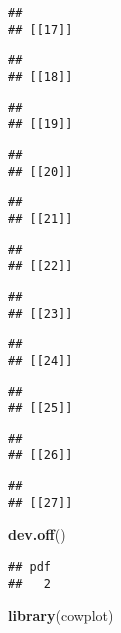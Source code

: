 \documentclass[]{article}
\newenvironment{Shaded}{\begin{snugshade}}{\end{snugshade}}
\newcommand{\KeywordTok}[1]{\textcolor[rgb]{0.13,0.29,0.53}{\textbf{#1}}}
\newcommand{\NormalTok}[1]{#1}
\begin{document}
\begin{verbatim}
## 
## [[17]]
\end{verbatim}

\begin{verbatim}
## 
## [[18]]
\end{verbatim}

\begin{verbatim}
## 
## [[19]]
\end{verbatim}

\begin{verbatim}
## 
## [[20]]
\end{verbatim}

\begin{verbatim}
## 
## [[21]]
\end{verbatim}

\begin{verbatim}
## 
## [[22]]
\end{verbatim}

\begin{verbatim}
## 
## [[23]]
\end{verbatim}

\begin{verbatim}
## 
## [[24]]
\end{verbatim}

\begin{verbatim}
## 
## [[25]]
\end{verbatim}

\begin{verbatim}
## 
## [[26]]
\end{verbatim}

\begin{verbatim}
## 
## [[27]]
\end{verbatim}

\begin{Shaded}
\begin{Highlighting}[]
\KeywordTok{dev.off}\NormalTok{()}
\end{Highlighting}
\end{Shaded}

\begin{verbatim}
## pdf 
##   2
\end{verbatim}

\begin{Shaded}
\begin{Highlighting}[]
\KeywordTok{library}\NormalTok{(cowplot)}
\end{Highlighting}
\end{Shaded}
\end{document}
